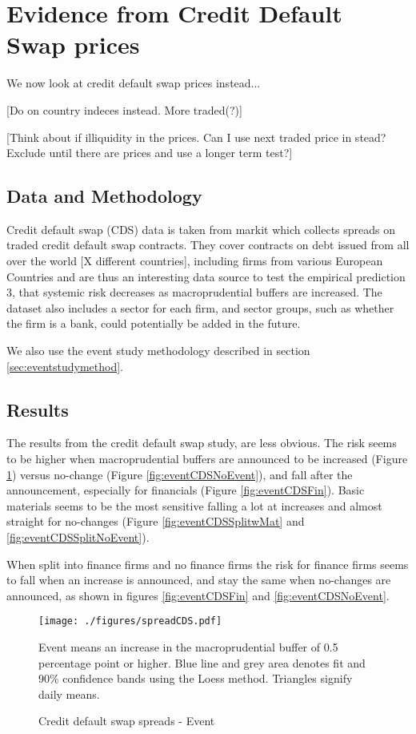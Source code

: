 \documentclass[11pt]{article}
\newcommand\fnote[1]{\captionsetup{font=small}\caption*{#1}}
\begin{document}
\section{Evidence from Credit Default Swap prices}
We now look at credit default swap prices instead...

[Do on country indeces instead. More traded(?)]

[Think about if illiquidity in the prices. Can I use next traded price in stead? Exclude until there are prices and use a longer term test?]

\subsection{Data and Methodology}
Credit default swap (CDS) data is taken from markit which collects spreads on traded credit default swap contracts. They cover contracts on debt issued from all over the world [X different countries], including firms from various European Countries and are thus an interesting data source to test the empirical prediction 3, that systemic risk decreases as macroprudential buffers are increased. The dataset also includes a sector for each firm, and sector groups, such as whether the firm is a bank, could potentially be added in the future.

We also use the event study methodology described in section \ref{sec:eventstudymethod}.

\subsection{Results}
The results from the credit default swap study, are less obvious. The risk seems to be higher when macroprudential buffers are announced to be increased (Figure \ref{fig:eventCDS}) versus no-change (Figure \ref{fig:eventCDSNoEvent}), and fall after the announcement, especially for financials (Figure \ref{fig:eventCDSFin}). Basic materials seems to be the most sensitive falling a lot at increases and almost straight for no-changes (Figure \ref{fig:eventCDSSplitwMat} and \ref{fig:eventCDSSplitNoEvent}). 

When split into finance firms and no finance firms the risk for finance firms seems to fall when an increase is announced, and stay the same when no-changes are announced, as shown in figures \ref{fig:eventCDSFin} and \ref{fig:eventCDSNoEvent}.

\begin{figure}%
	\centering
	\texttt{[image: ./figures/spreadCDS.pdf]}
	\caption{Credit default swap spreads - Event}
	\label{fig:eventCDS}
	\fnote{Event means an increase in the macroprudential buffer of 0.5 percentage point or higher. Blue line and grey area denotes fit and 90\% confidence bands using the Loess method. Triangles signify daily means.}
\end{figure}
\end{document}
